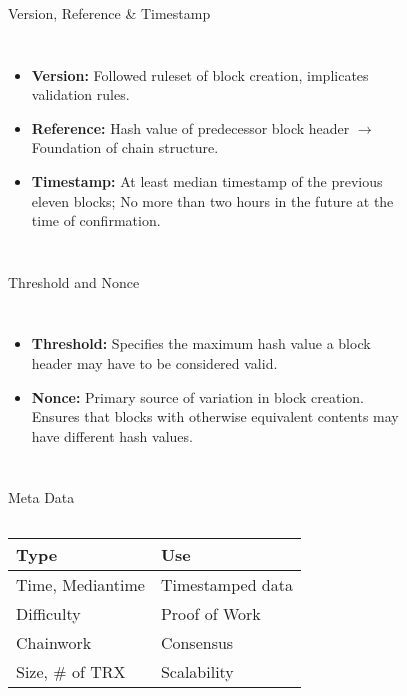 \documentclass[]{beamer}
\begin{document}
\begin{frame}{Version, Reference \& Timestamp}
	\begin{columns}
		\begin{itemize}
			\item \textbf{Version:} Followed ruleset of block creation, implicates validation rules.
			\item \textbf{Reference:} Hash value of predecessor block header $\rightarrow$ Foundation of chain structure.
			\item \textbf{Timestamp:} At least median timestamp of the previous eleven blocks; No more than two hours in the future at the time of confirmation. 
		\end{itemize}
		\begin{figure}
			
		\end{figure}
	\end{columns}
\end{frame}


\begin{frame}{Threshold and Nonce}
	\begin{columns}
	\column{0.7\textwidth}
		\begin{itemize}
			\item \textbf{Threshold:} Specifies the maximum hash value a block header may have to be considered valid.
			\item \textbf{Nonce:} Primary source of variation in block creation. Ensures that blocks with otherwise equivalent contents may have different hash values.
		\end{itemize}
	\column{0.3\textwidth}
		\begin{figure}
			
		\end{figure}
	\end{columns}
\end{frame}


\begin{frame}{Meta Data}
	\begin{columns}
	\column{0.6\textwidth}
		\begin{tabular}{l|l}
			\textbf{Type} & \textbf{Use} \\
			\hline
			Time, Mediantime & Timestamped data \\
			Difficulty & Proof of Work \\
			Chainwork & Consensus \\
			Size, \# of TRX & Scalability
		\end{tabular}
	\column{0.4\textwidth}
		\begin{figure}
			\begin{tikzpicture}[domain=-8:8,scale=1.2, every node/.style={scale=1.2}]
  				
  			\end{tikzpicture}
			\end{figure}
	\end{columns}
\end{frame}
\end{document}

